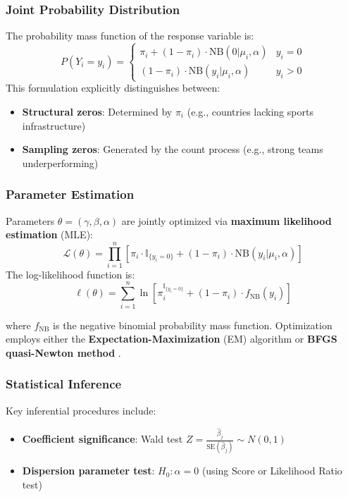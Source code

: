 \documentclass[11pt,twoside]{article}
\numberwithin{Theorem}{section}
\numberwithin{Definition}{section}
\numberwithin{Lemma}{section}
\numberwithin{Algorithm}{section}
\numberwithin{equation}{section}
\begin{document}
\subsubsection{Joint Probability Distribution}
The probability mass function of the response variable is:
\begin{equation}
P(Y_i = y_i) = 
\begin{cases} 
\pi_i + (1 - \pi_i) \cdot \text{NB}(0|\mu_i, \alpha) & y_i = 0 \\
(1 - \pi_i) \cdot \text{NB}(y_i|\mu_i, \alpha) & y_i > 0 
\end{cases}
\end{equation}
This formulation explicitly distinguishes between:
\begin{itemize}
    \item \textbf{Structural zeros}: Determined by $\pi_i$ (e.g., countries lacking sports infrastructure)
    \item \textbf{Sampling zeros}: Generated by the count process (e.g., strong teams underperforming) \cite{cameron2013}
\end{itemize}

\subsubsection{Parameter Estimation}
Parameters $\theta = (\gamma, \beta, \alpha)$ are jointly optimized via \textbf{maximum likelihood estimation} (MLE):
\begin{equation}
\mathcal{L}(\theta) = \prod_{i=1}^n \left[ \pi_i \cdot \mathbb{I}_{\{y_i=0\}} + (1 - \pi_i) \cdot \text{NB}(y_i|\mu_i, \alpha) \right]
\end{equation}
The log-likelihood function is:
\begin{equation}
\ell(\theta) = \sum_{i=1}^n \ln \left[ \pi_i^{\mathbb{I}_{\{y_i=0\}}} + (1 - \pi_i) \cdot f_{\text{NB}}(y_i) \right]
\end{equation}

where $f_{\text{NB}}$ is the negative binomial probability mass function. Optimization employs either the \textbf{Expectation-Maximization} (EM) algorithm or \textbf{BFGS quasi-Newton method} \cite{seabold2010}.
\subsubsection{Statistical Inference}
Key inferential procedures include:
\begin{itemize}
    \item \textbf{Coefficient significance}: Wald test $Z = \frac{\hat{\beta}_j}{\text{SE}(\hat{\beta}_j)} \sim N(0,1)$
    \item \textbf{Dispersion parameter test}: $H_0: \alpha=0$ (using Score or Likelihood Ratio test)
\end{itemize}
\end{document}
